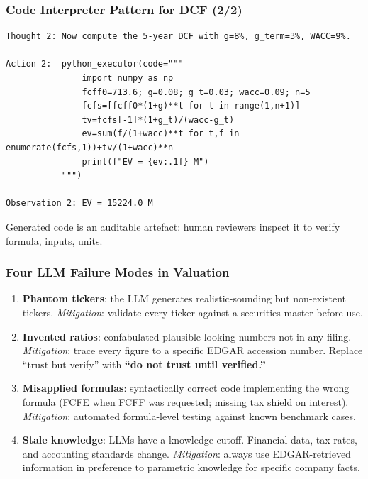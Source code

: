 \documentclass[9pt,t]{beamer}
\begin{document}
\begin{frame}[fragile]
\frametitle{Code Interpreter Pattern for DCF (2/2)}

\begin{lstlisting}[basicstyle=\ttfamily\scriptsize]
Thought 2: Now compute the 5-year DCF with g=8%, g_term=3%, WACC=9%.

Action 2:  python_executor(code="""
               import numpy as np
               fcff0=713.6; g=0.08; g_t=0.03; wacc=0.09; n=5
               fcfs=[fcff0*(1+g)**t for t in range(1,n+1)]
               tv=fcfs[-1]*(1+g_t)/(wacc-g_t)
               ev=sum(f/(1+wacc)**t for t,f in enumerate(fcfs,1))+tv/(1+wacc)**n
               print(f"EV = {ev:.1f} M")
           """)

Observation 2: EV = 15224.0 M
\end{lstlisting}

Generated code is an auditable artefact: human reviewers inspect it to verify formula, inputs, units.
\end{frame}

\begin{frame}
\frametitle{Four LLM Failure Modes in Valuation}

\begin{enumerate}
  \item \textbf{Phantom tickers}: the LLM generates realistic-sounding but non-existent tickers.
        \textit{Mitigation}: validate every ticker against a securities master before use.

  \item \textbf{Invented ratios}: confabulated plausible-looking numbers not in any filing.
        \textit{Mitigation}: trace every figure to a specific EDGAR accession number.
        Replace ``trust but verify'' with \textbf{``do not trust until verified.''}

  \item \textbf{Misapplied formulas}: syntactically correct code implementing the wrong formula
        (FCFE when FCFF was requested; missing tax shield on interest).
        \textit{Mitigation}: automated formula-level testing against known benchmark cases.

  \item \textbf{Stale knowledge}: LLMs have a knowledge cutoff. Financial data, tax rates,
        and accounting standards change.
        \textit{Mitigation}: always use EDGAR-retrieved information in preference to parametric
        knowledge for specific company facts.
\end{enumerate}
\end{frame}
\end{document}
